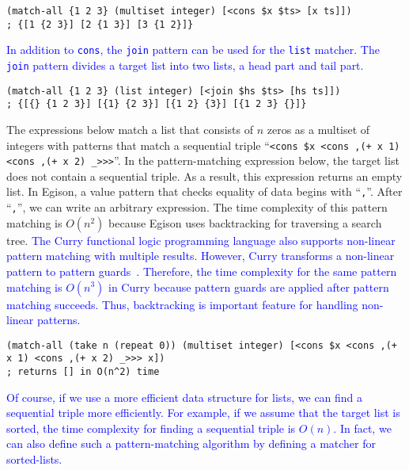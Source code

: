 \documentclass[acmlarge]{acmart}
\newcommand{\new}[1]{\textcolor{blue}{#1}}
\begin{document}
\begin{lstlisting}[language=egison]
(match-all {1 2 3} (multiset integer) [<cons $x $ts> [x ts]])
; {[1 {2 3}] [2 {1 3}] [3 {1 2}]}
\end{lstlisting}

\new{
In addition to \lstinline{cons}, the \lstinline{join} pattern can be used for the \lstinline{list} matcher.
The \lstinline{join} pattern divides a target list into two lists, a head part and tail part.
}%

\begin{lstlisting}[language=egison]
(match-all {1 2 3} (list integer) [<join $hs $ts> [hs ts]])
; {[{} {1 2 3}] [{1} {2 3}] [{1 2} {3}] [{1 2 3} {}]}
\end{lstlisting}

The expressions below match a list that consists of $n$ zeros as a multiset of integers with patterns that match a sequential triple ``\lstinline{<cons $x <cons ,(+ x 1) <cons ,(+ x 2) _>>>}''.
In the pattern-matching expression below, the target list does not contain a sequential triple.
As a result, this expression returns an empty list.
In Egison, a value pattern that checks equality of data begins with ``\lstinline{,}''.
After ``\lstinline{,}'',  we can write an arbitrary expression.
The time complexity of this pattern matching is $O(n^2)$ because Egison uses backtracking for traversing a search tree.
\new{
The Curry functional logic programming language also supports non-linear pattern matching with multiple results.
However, Curry transforms a non-linear pattern to pattern guards~\cite{antoy2010programming,antoy2001constructor,hanus2007multi}.
Therefore, the time complexity for the same pattern matching is $O(n^3)$ in Curry because pattern guards are applied after pattern matching succeeds.
Thus, backtracking is important feature for handling non-linear patterns.
}%

\begin{lstlisting}[language=egison]
(match-all (take n (repeat 0)) (multiset integer) [<cons $x <cons ,(+ x 1) <cons ,(+ x 2) _>>> x])
; returns [] in O(n^2) time
\end{lstlisting}

\noindent
\new{
Of course, if we use a more efficient data structure for lists, we can find a sequential triple more efficiently.
For example, if we assume that the target list is sorted, the time complexity for finding a sequential triple is $O(n)$.
In fact, we can also define such a pattern-matching algorithm by defining a matcher for sorted-lists.
}%
\end{document}
